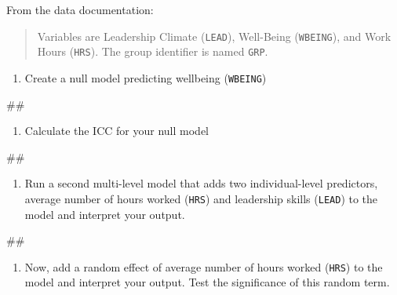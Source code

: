 \documentclass[]{book}
\newenvironment{Shaded}{\begin{snugshade}}{\end{snugshade}}
\newcommand{\NormalTok}[1]{#1}
\providecommand{\tightlist}{%
  \setlength{\itemsep}{0pt}\setlength{\parskip}{0pt}}
\begin{document}
From the data documentation:

\begin{quote}
Variables are Leadership Climate (\texttt{LEAD}), Well-Being
(\texttt{WBEING}), and Work Hours (\texttt{HRS}). The group identifier
is named \texttt{GRP}.
\end{quote}

\begin{enumerate}
\def\labelenumi{\arabic{enumi}.}
\tightlist
\item
  Create a null model predicting wellbeing (\texttt{WBEING})
\end{enumerate}

\begin{Shaded}
\begin{Highlighting}[]
\NormalTok{## }
\end{Highlighting}
\end{Shaded}

\begin{enumerate}
\def\labelenumi{\arabic{enumi}.}
\setcounter{enumi}{1}
\tightlist
\item
  Calculate the ICC for your null model
\end{enumerate}

\begin{Shaded}
\begin{Highlighting}[]
\NormalTok{## }
\end{Highlighting}
\end{Shaded}

\begin{enumerate}
\def\labelenumi{\arabic{enumi}.}
\setcounter{enumi}{2}
\tightlist
\item
  Run a second multi-level model that adds two individual-level
  predictors, average number of hours worked (\texttt{HRS}) and
  leadership skills (\texttt{LEAD}) to the model and interpret your
  output.
\end{enumerate}

\begin{Shaded}
\begin{Highlighting}[]
\NormalTok{## }
\end{Highlighting}
\end{Shaded}

\begin{enumerate}
\def\labelenumi{\arabic{enumi}.}
\setcounter{enumi}{3}
\tightlist
\item
  Now, add a random effect of average number of hours worked
  (\texttt{HRS}) to the model and interpret your output. Test the
  significance of this random term.
\end{enumerate}
\end{document}
